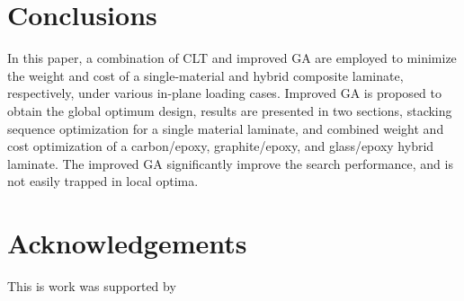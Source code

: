\documentclass[smallextended]{svjour3}       %
\begin{document}

\section{Conclusions}
In this paper, a combination of CLT and improved GA are employed to minimize
the weight and cost of a single-material and hybrid composite laminate,
respectively, under various in-plane loading cases. Improved GA is proposed to
obtain the global optimum design, results are presented in two sections,
stacking sequence optimization for a single material laminate, and combined
weight and cost optimization of a carbon/epoxy, graphite/epoxy, and glass/epoxy
hybrid laminate. The improved GA significantly improve the search performance,
and is not easily trapped in local optima.

\section{Acknowledgements}
This is work was supported by 






\end{document}
